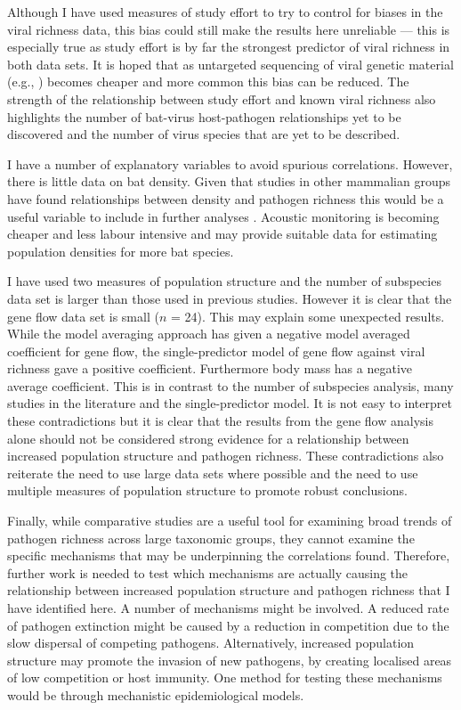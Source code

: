 Although I have used measures of study effort to try to control for biases in the viral richness data, this bias could still make the results here unreliable --- this is especially true as study effort is by far the strongest predictor of viral richness in both data sets.
It is hoped that as untargeted sequencing of viral genetic material (e.g., \textcite{anthony2013strategy}) becomes cheaper and more common this bias can be reduced.
The strength of the relationship between study effort and known viral richness also highlights the number of bat-virus host-pathogen relationships yet to be discovered and the number of virus species that are yet to be described.

I have a number of explanatory variables to avoid spurious correlations.
However, there is little data on bat density.
Given that studies in other mammalian groups have found relationships between density and pathogen richness this would be a useful variable to include in further analyses \cite{kamiya2014determines, nunn2003comparative, arneberg2002host}.
Acoustic monitoring is becoming cheaper and less labour intensive and may provide suitable data for estimating population densities for more bat species.

I have used two measures of population structure and the number of subspecies data set is larger than those used in previous studies.
However it is clear that the gene flow data set is small ($n$ = 24).
This may explain some unexpected results.
While the model averaging approach has given a negative model averaged coefficient for gene flow, the single-predictor model of gene flow against viral richness gave a positive coefficient.
Furthermore body mass has a negative average coefficient.
This is in contrast to the number of subspecies analysis, many studies in the literature \cite{kamiya2014determines, turmelle2009correlates, gay2014parasite, maganga2014bat} and the single-predictor model.
It is not easy to interpret these contradictions but it is clear that the results from the gene flow analysis alone should not be considered strong evidence for a relationship between increased population structure and pathogen richness.
These contradictions also reiterate the need to use large data sets where possible and the need to use multiple measures of population structure to promote robust conclusions.

Finally, while comparative studies are a useful tool for examining broad trends of pathogen richness across large taxonomic groups, they cannot examine the specific mechanisms that may be underpinning the correlations found.
Therefore, further work is needed to test which mechanisms are actually causing the relationship between increased population structure and pathogen richness that I have identified here.
A number of mechanisms might be involved.
A reduced rate of pathogen extinction might be caused by a reduction in competition due to the slow dispersal of competing pathogens.
Alternatively, increased population structure may promote the invasion of new pathogens, by creating localised areas of low competition or host immunity.
One method for testing these mechanisms would be through mechanistic epidemiological models.

